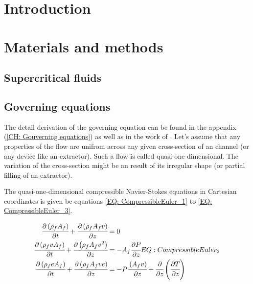 \documentclass[a4paper,fleqn]{cas-dc}
\begin{document}
\maketitle


\section{Introduction}


\section{Materials and methods} \label{CH: Materials and methods}

\subsection{Supercritical fluids} \label{CH: Thermodynamic}


%

\subsection{Governing equations}
The detail derivation of the governing equation can be found in the appendix (\ref{CH: Gouverning equations}) as well as in the work of \citet{Anderson1995}. Let's assume that any properties of the flow are unifrom across any given cross-section of an channel (or any device like an extractor). Such a flow is called quasi-one-dimensional. The variation of the cross-section might be an result of its irregular shape (or partial filling of an extractor). 

The quasi-one-dimensional compressible Navier-Stokes equations in Cartesian coordinates is given be equations \ref{EQ: CompressibleEuler_1} to \ref{EQ: CompressibleEuler_3}.

{\footnotesize
\begin{align}
		\label{EQ: CompressibleEuler_1}
        \cfrac{\partial \left( \rho_f A_f \right) }{\partial t} + \cfrac{\partial \left( \rho_f A_f v \right)}{\partial z} &= 0 \\
        \cfrac{\partial \left( \rho_f v A_f \right) }{\partial t} + \cfrac{\partial \left( \rho_f A_f v^2 \right)}{\partial z} &= -A_f \cfrac{\partial P}{\partial z} {EQ: CompressibleEuler_2} \\
        \cfrac{\partial \left( \rho_f e A_f \right) }{\partial t} + \cfrac{\partial \left( \rho_f A_f v e\right)}{\partial z} &= -P\cfrac{\left( A_f v \right)}{\partial z} + \cfrac{\partial}{\partial z} \left( \cfrac{\partial T}{\partial z} \right)   
        \label{EQ: CompressibleEuler_3}
    \end{align}  
}
\end{document}
